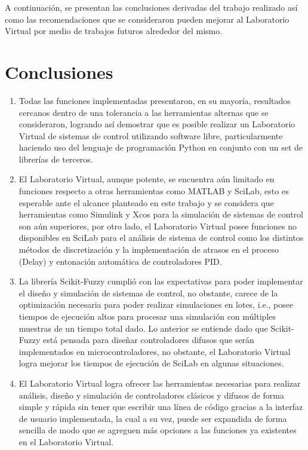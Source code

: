 A continuación, se presentan las conclusiones derivadas del trabajo realizado así como las recomendaciones que se consideraron pueden mejorar al Laboratorio Virtual por medio de trabajos futuros alrededor del mismo.

\section{Conclusiones}

    \begin{enumerate}[leftmargin=15pt]
        \setlength\itemsep{10pt}    
        \item Todas las funciones implementadas presentaron, en su mayoría, resultados cercanos dentro de una tolerancia a las herramientas alternas que se consideraron, logrando así demostrar que es posible realizar un Laboratorio Virtual de sistemas de control utilizando software libre, particularmente haciendo uso del lenguaje de programación Python en conjunto con un set de librerías de terceros.
        
        \item El Laboratorio Virtual, aunque potente, se encuentra aún limitado en funciones respecto a otras herramientas como MATLAB y SciLab, esto es esperable ante el alcance planteado en este trabajo y se considera que herramientas como Simulink y Xcos para la simulación de sistemas de control son aún superiores, por otro lado, el Laboratorio Virtual posee funciones no disponibles en SciLab para el análisis de sistema de control como los distintos métodos de discretización y la implementación de atrasos en el proceso (Delay) y entonación automática de controladores PID.
        
        \item La librería Scikit-Fuzzy cumplió con las expectativas para poder implementar el diseño y simulación de sistemas de control, no obstante, carece de la optimización necesaria para poder realizar simulaciones en lotes, i.e., posee tiempos de ejecución altos para procesar una simulación con múltiples muestras de un tiempo total dado. Lo anterior se entiende dado que Scikit-Fuzzy está pensada para diseñar controladores difusos que serán implementados en microcontroladores, no obstante, el Laboratorio Virtual logra mejorar los tiempos de ejecución de SciLab en algunas situaciones.
        
        \item El Laboratorio Virtual logra ofrecer las herramientas necesarias para realizar análisis, diseño y simulación de controladores clásicos y difusos de forma simple y rápida sin tener que escribir una línea de código gracias a la interfaz de usuario implementada, la cual a su vez, puede ser expandida de forma sencilla de modo que se agreguen más opciones a las funciones ya existentes en el Laboratorio Virtual.
        

\end{enumerate}
